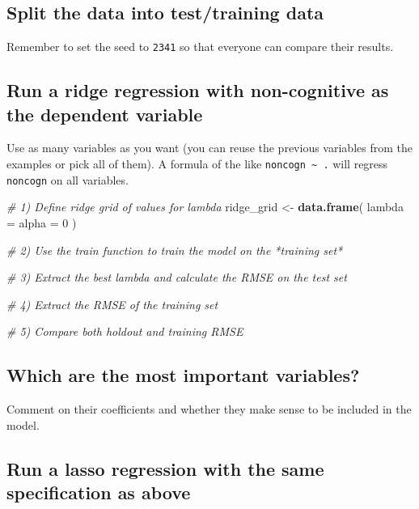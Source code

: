 \documentclass[
]{book}
\newenvironment{Shaded}{\begin{snugshade}}{\end{snugshade}}
\newcommand{\CommentTok}[1]{\textcolor[rgb]{0.56,0.35,0.01}{\textit{#1}}}
\newcommand{\DataTypeTok}[1]{\textcolor[rgb]{0.13,0.29,0.53}{#1}}
\newcommand{\DecValTok}[1]{\textcolor[rgb]{0.00,0.00,0.81}{#1}}
\newcommand{\KeywordTok}[1]{\textcolor[rgb]{0.13,0.29,0.53}{\textbf{#1}}}
\newcommand{\NormalTok}[1]{#1}
\newcommand{\StringTok}[1]{\textcolor[rgb]{0.31,0.60,0.02}{#1}}
\begin{document}
\hypertarget{split-the-data-into-testtraining-data}{%
\subsection{Split the data into test/training data}\label{split-the-data-into-testtraining-data}}

Remember to set the seed to \texttt{2341} so that everyone can compare their results.

\hypertarget{run-a-ridge-regression-with-non-cognitive-as-the-dependent-variable}{%
\subsection{Run a ridge regression with non-cognitive as the dependent variable}\label{run-a-ridge-regression-with-non-cognitive-as-the-dependent-variable}}

Use as many variables as you want (you can reuse the previous variables from the examples or pick all of them). A formula of the like \texttt{noncogn\ \textasciitilde{}\ .} will regress \texttt{noncogn} on all variables.

\begin{Shaded}
\begin{Highlighting}[]
\CommentTok{# 1) Define ridge grid of values for lambda}
\NormalTok{ridge_grid <-}\StringTok{ }\KeywordTok{data.frame}\NormalTok{(}
  \DataTypeTok{lambda =} 
  \DataTypeTok{alpha =} \DecValTok{0}
\NormalTok{)}

\CommentTok{# 2) Use the train function to train the model on the *training set*}

\CommentTok{# 3) Extract the best lambda and calculate the RMSE on the test set}

\CommentTok{# 4) Extract the RMSE of the training set}

\CommentTok{# 5) Compare both holdout and training RMSE}
\end{Highlighting}
\end{Shaded}

\hypertarget{which-are-the-most-important-variables}{%
\subsection{Which are the most important variables?}\label{which-are-the-most-important-variables}}

Comment on their coefficients and whether they make sense to be included in the model.

\hypertarget{run-a-lasso-regression-with-the-same-specification-as-above}{%
\subsection{Run a lasso regression with the same specification as above}\label{run-a-lasso-regression-with-the-same-specification-as-above}}
\end{document}
